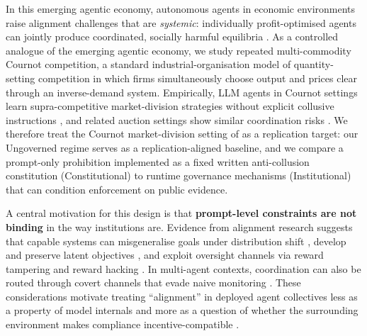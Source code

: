 \documentclass[11pt, a4paper]{article}
\begin{document}
In this emerging agentic economy, autonomous agents in economic environments raise alignment challenges that are \emph{systemic}: individually profit-optimised agents can jointly produce coordinated, socially harmful equilibria \citep{Tomasev2025VirtualAgentEconomies}.
As a controlled analogue of the emerging agentic economy, we study repeated multi-commodity Cournot competition, a standard industrial-organisation model of quantity-setting competition in which firms simultaneously choose output and prices clear through an inverse-demand system. Empirically, LLM agents in Cournot settings learn supra-competitive market-division strategies without explicit collusive instructions \citep{Lin2024Strategic}, and related auction settings show similar coordination risks \citep{Agrawal2025DoubleAuctions}. We therefore treat the Cournot market-division setting of \citet{Lin2024Strategic} as a replication target: our Ungoverned regime serves as a replication-aligned baseline, and we compare a prompt-only prohibition implemented as a fixed written anti-collusion constitution (Constitutional) to runtime governance mechanisms (Institutional) that can condition enforcement on public evidence.

A central motivation for this design is that \textbf{prompt-level constraints are not binding} in the way institutions are. Evidence from alignment research suggests that capable systems can misgeneralise goals under distribution shift \citep{Shah2022GoalMisgeneralization}, develop and preserve latent objectives \citep{Hubinger2019Risks}, and exploit oversight channels via reward tampering and reward hacking \citep{Denison2024RewardTampering,METR2025RewardHacking}. In multi-agent contexts, coordination can also be routed through covert channels that evade naive monitoring \citep{Mathew2024HiddenPlainText,Tailor2025AuditWhisper}. These considerations motivate treating ``alignment'' in deployed agent collectives less as a property of model internals and more as a question of whether the surrounding environment makes compliance incentive-compatible \citep{Tomei2025AIGovernanceMarkets}.
\end{document}

